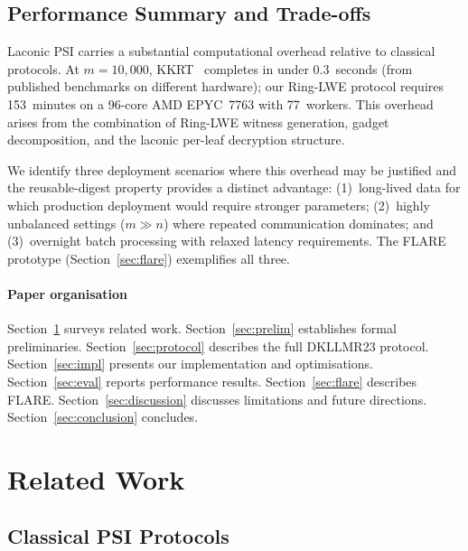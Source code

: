 \documentclass[preprint,12pt]{elsarticle}
\begin{document}
\subsection{Performance Summary and Trade-offs}

Laconic PSI carries a substantial computational overhead relative to classical
protocols. At $m = 10{,}000$, KKRT~\cite{kolesnikov2016kkrt} completes in
under 0.3~seconds (from published benchmarks on different hardware); our
Ring-LWE protocol requires 153~minutes on a 96-core AMD EPYC~7763 with
77~workers. This overhead arises from the combination of Ring-LWE witness generation,
gadget decomposition, and the laconic per-leaf decryption structure.

We identify three deployment scenarios where this overhead may be justified
and the reusable-digest property provides a distinct advantage:
(1)~long-lived data for which production deployment would require stronger
parameters; (2)~highly unbalanced settings ($m \gg n$) where repeated
communication dominates; and (3)~overnight batch processing with relaxed
latency requirements. The FLARE prototype (Section~\ref{sec:flare})
exemplifies all three.

\paragraph{Paper organisation}
Section~\ref{sec:related} surveys related work.
Section~\ref{sec:prelim} establishes formal preliminaries.
Section~\ref{sec:protocol} describes the full DKLLMR23 protocol.
Section~\ref{sec:impl} presents our implementation and optimisations.
Section~\ref{sec:eval} reports performance results.
Section~\ref{sec:flare} describes FLARE.
Section~\ref{sec:discussion} discusses limitations and future directions.
Section~\ref{sec:conclusion} concludes.

\section{Related Work}
\label{sec:related}

\subsection{Classical PSI Protocols}
\end{document}

